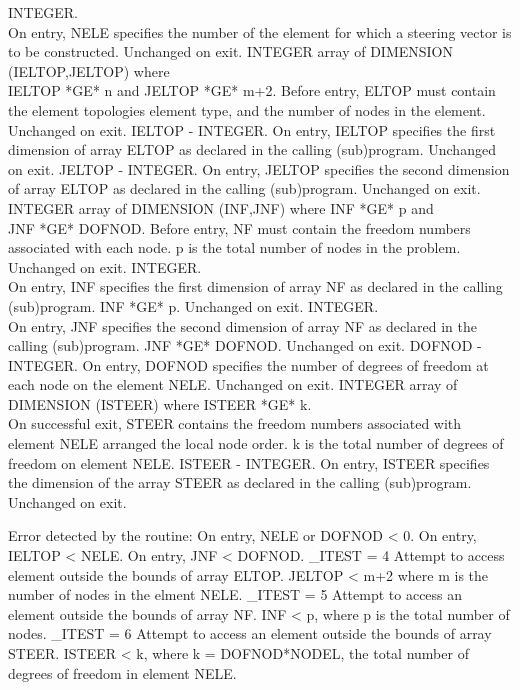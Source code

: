 \begin{parameters}
 INTEGER.\\
      On entry, NELE specifies the number of the element
      for which a steering vector is to be constructed.
      Unchanged on exit.
 INTEGER array of DIMENSION (IELTOP,JELTOP) where\\
      IELTOP *GE* n and JELTOP *GE* m+2.
      Before entry, ELTOP must contain the element topologies
      element type, and the number of nodes in the element.
      Unchanged on exit.
IELTOP - INTEGER.
      On entry, IELTOP specifies the first dimension of array
      ELTOP as declared in the calling (sub)program.
      Unchanged on exit.
JELTOP - INTEGER.
      On entry, JELTOP specifies the second dimension of array
      ELTOP as declared in the calling (sub)program.
      Unchanged on exit.
 INTEGER array of DIMENSION (INF,JNF) where INF *GE* p and\\
      JNF *GE* DOFNOD.
      Before entry, NF must contain the freedom numbers
      associated with each node. p is the total number of nodes
      in the problem.
      Unchanged on exit.
 INTEGER.\\
      On entry, INF specifies the first dimension of array NF as
      declared in the calling (sub)program. INF *GE* p.
      Unchanged on exit.
 INTEGER.\\
      On entry, JNF specifies the second dimension of array NF as
      declared in the calling (sub)program. JNF *GE* DOFNOD.
      Unchanged on exit.
DOFNOD - INTEGER.
      On entry, DOFNOD specifies the number of degrees of freedom
      at each node on the element NELE.
      Unchanged on exit.
 INTEGER array of DIMENSION (ISTEER) where ISTEER *GE* k.\\
      On successful exit, STEER contains the freedom numbers
      associated with element NELE arranged the local node order.
      k is the total number of degrees of freedom on element NELE.
ISTEER - INTEGER.
      On entry, ISTEER specifies the dimension of the array STEER
      as declared in the calling (sub)program.
      Unchanged on exit.

\end{parameters}
\begin{indicators}
Error detected by the routine:
 On entry, NELE or DOFNOD {{<}} 0.
 On entry, IELTOP < NELE.
 On entry, JNF < DOFNOD.
 _ITEST = 4  Attempt to access element outside the
                 bounds of array ELTOP. JELTOP < m+2 where
                 m is the number of nodes in the elment NELE.
 _ITEST = 5  Attempt to access an element outside the
                 bounds of array NF. INF < p, where p is
                 the total number of nodes.
 _ITEST = 6  Attempt to access an element outside the
                 bounds of array STEER. ISTEER < k, where
                 k = DOFNOD*NODEL, the total number of
                 degrees of freedom in element NELE.
\end{indicators}

